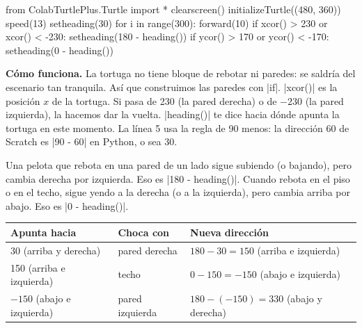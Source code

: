 \begin{tcbraster}[raster columns=2, raster equal height=rows, raster column skip=12pt, raster valign=center, raster force size=false, raster column 1/.style={width=0.28\linewidth}, raster column 2/.style={width=0.72\linewidth-12pt}]
\begin{tcolorbox}[colback=white, colframe=white, boxrule=0pt, valign=center, left=0pt, right=0pt]
\begin{scratch}
\end{scratch}
\end{tcolorbox}
\begin{code}
from ColabTurtlePlus.Turtle import *
clearscreen()
initializeTurtle((480, 360))
speed(13)
setheading(30)
for i in range(300):
    forward(10)
    if xcor() > 230 or xcor() < -230:
        setheading(180 - heading())
    if ycor() > 170 or ycor() < -170:
        setheading(0 - heading())
\end{code}
\end{tcbraster}

\textbf{Cómo funciona.} La tortuga no tiene bloque de rebotar ni paredes: se saldría del escenario tan tranquila. Así que construimos las paredes con \py|if|. \py|xcor()| es la posición $x$ de la tortuga. Si pasa de 230 (la pared derecha) o de $-230$ (la pared izquierda), la hacemos dar la vuelta. \py|heading()| te dice hacia dónde apunta la tortuga en este momento. La línea 5 usa la regla de 90 menos: la dirección 60 de Scratch es \py|90 - 60| en Python, o sea 30.

\begin{think}
Una pelota que rebota en una pared de un lado sigue subiendo (o bajando), pero cambia derecha por izquierda. Eso es \py|180 - heading()|. Cuando rebota en el piso o en el techo, sigue yendo a la derecha (o a la izquierda), pero cambia arriba por abajo. Eso es \py|0 - heading()|.
\begin{center}
\renewcommand{\arraystretch}{1.25}
\begin{tabular}{lll}
\toprule
\textbf{Apunta hacia} & \textbf{Choca con} & \textbf{Nueva dirección} \\
\midrule
30 (arriba y derecha) & pared derecha & $180 - 30 = 150$ (arriba e izquierda) \\
150 (arriba e izquierda) & techo & $0 - 150 = -150$ (abajo e izquierda) \\
$-150$ (abajo e izquierda) & pared izquierda & $180 - (-150) = 330$ (abajo y derecha) \\
\bottomrule
\end{tabular}
\end{center}
\end{think}

